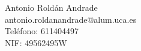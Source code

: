 Antonio Roldán Andrade \\ %
antonio.roldanandrade@alum.uca.es \\ %
Teléfono: 611404497 \\ %
NIF: 49562495W \\ %
